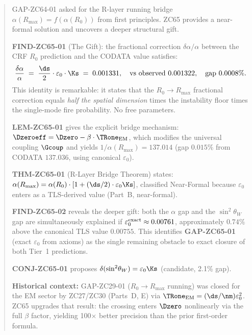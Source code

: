 \documentclass[12pt, a4paper]{article}
\renewcommand{\swsq}{\sin^2\!\theta_W}
\begin{document}
\begin{abstract}
\noindent
GAP-ZC64-01 asked for the R-layer running bridge
$\alpha(R_{\max}) = f(\alpha(R_0))$ from first principles.
ZC65 provides a near-formal solution and uncovers a
deeper structural gift.

\textbf{FIND-ZC65-01} (The Gift): the fractional correction
$\delta\alpha/\alpha$ between the CRF $R_0$ prediction and
the CODATA value satisfies:
\[
  \frac{\delta\alpha}{\alpha}
  \;=\;
  \frac{\ds}{2}\cdot\varepsilon_0\cdot\Ks
  \;=\; 0.001331,
  \quad\text{vs observed }0.001322,
  \quad\text{gap }0.0008\%.
\]
This identity is remarkable: it states that the $R_0\to R_{\max}$
fractional correction equals \emph{half the spatial dimension}
times the instability floor times the single-mode fire probability.
No free parameters.

\textbf{LEM-ZC65-01} gives the explicit bridge mechanism:
$\Dzeroeff = \Dzero - \beta\cdot\TRone_{\rm EM}$,
which modifies the universal coupling $\Gcoup$
and yields $1/\alpha(R_{\max}) = 137.014$
(gap $0.015\%$ from CODATA $137.036$, using canonical $\varepsilon_0$).

\textbf{THM-ZC65-01} (R-Layer Bridge Theorem) states:
$\alpha(R_{\max}) = \alpha(R_0)\cdot[1 + (\ds/2)\cdot\varepsilon_0\Ks]$,
classified Near-Formal because $\varepsilon_0$ enters as a
TLS-derived value (Part~B, near-formal).

\textbf{FIND-ZC65-02} reveals the deeper gift:
both the $\alpha$ gap and the $\swsq$ gap are simultaneously
explained if $\varepsilon_0^{\rm exact} \approx 0.00761$,
approximately $0.74\%$ above the canonical TLS value $0.00755$.
This identifies \textbf{GAP-ZC65-01}
(exact $\varepsilon_0$ from axioms) as the single remaining
obstacle to exact closure of both Tier~1 predictions.

\textbf{CONJ-ZC65-01} proposes
$\delta(\swsq) = \varepsilon_0\Ks$ (candidate, 2.1\% gap).

\textbf{Historical context:} GAP-ZC29-01 ($R_0\to R_{\max}$
running) was closed for the EM sector by ZC27/ZC30
(Parts~D, E) via $\TRone_{\rm EM} = (\ds/\nm)\varepsilon_0^2$.
ZC65 upgrades that result: the crossing enters
$\Dzero$ nonlinearly via the full $\beta$ factor,
yielding 100$\times$ better precision than the prior
first-order formula.
\end{abstract}

\tableofcontents
\newpage

\end{document}
